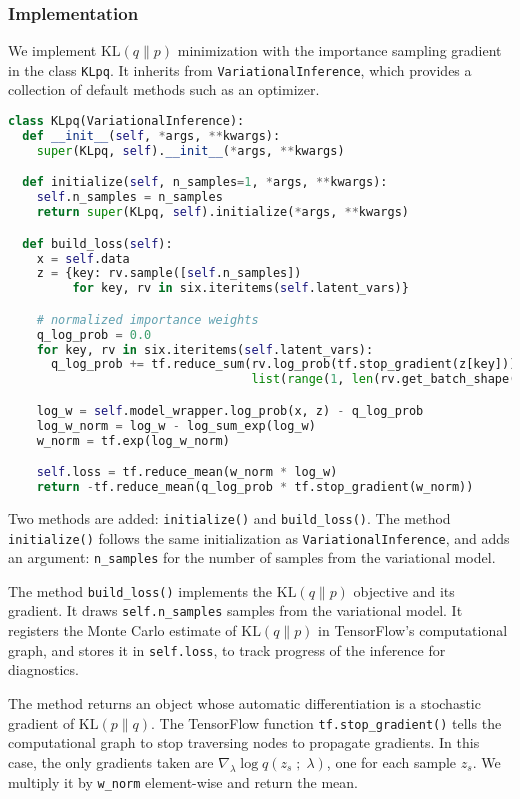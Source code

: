 \subsubsection{Implementation}

We implement $\text{KL}(q\|p)$ minimization with the importance
sampling gradient in the class \texttt{KLpq}. It inherits from
\texttt{VariationalInference}, which provides a collection of default
methods such as an optimizer.

\begin{lstlisting}[language=Python]
class KLpq(VariationalInference):
  def __init__(self, *args, **kwargs):
    super(KLpq, self).__init__(*args, **kwargs)

  def initialize(self, n_samples=1, *args, **kwargs):
    self.n_samples = n_samples
    return super(KLpq, self).initialize(*args, **kwargs)

  def build_loss(self):
    x = self.data
    z = {key: rv.sample([self.n_samples])
         for key, rv in six.iteritems(self.latent_vars)}

    # normalized importance weights
    q_log_prob = 0.0
    for key, rv in six.iteritems(self.latent_vars):
      q_log_prob += tf.reduce_sum(rv.log_prob(tf.stop_gradient(z[key])),
                                  list(range(1, len(rv.get_batch_shape()) + 1)))

    log_w = self.model_wrapper.log_prob(x, z) - q_log_prob
    log_w_norm = log_w - log_sum_exp(log_w)
    w_norm = tf.exp(log_w_norm)

    self.loss = tf.reduce_mean(w_norm * log_w)
    return -tf.reduce_mean(q_log_prob * tf.stop_gradient(w_norm))
\end{lstlisting}

Two methods are added: \texttt{initialize()} and
\texttt{build_loss()}. The method \texttt{initialize()}
follows the same initialization as \texttt{VariationalInference}, and
adds an argument: \texttt{n_samples} for the number of samples from
the variational model.

The method \texttt{build_loss()} implements the $\text{KL}(q\|p)$
objective and its gradient. It draws \texttt{self.n_samples} samples from the
variational model. It registers the Monte Carlo
estimate of $\text{KL}(q\|p)$ in TensorFlow's computational graph, and stores it
in \texttt{self.loss}, to track progress of the inference for diagnostics.

The method returns an object whose
automatic differentiation is a stochastic gradient of $\text{KL}(p\|q)$.
The TensorFlow function \texttt{tf.stop_gradient()} tells the computational
graph to stop traversing nodes to propagate gradients. In this case,
the only gradients taken are $\nabla_\lambda \log q(z_s\;;\;\lambda)$,
one for each sample $z_s$. We multiply it by \texttt{w_norm}
element-wise and return the mean.

